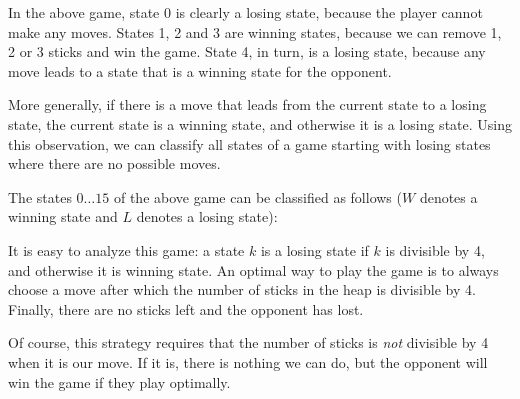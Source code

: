 In the above game, state 0 is clearly a
losing state, because the player cannot make
any moves.
States 1, 2 and 3 are winning states,
because we can remove 1, 2 or 3 sticks
and win the game.
State 4, in turn, is a losing state,
because any move leads to a state that
is a winning state for the opponent.

More generally, if there is a move that leads
from the current state to a losing state,
the current state is a winning state,
and otherwise it is a losing state.
Using this observation, we can classify all states
of a game starting with losing states where
there are no possible moves.

The states $0 \ldots 15$ of the above game
can be classified as follows
($W$ denotes a winning state and $L$ denotes a losing state):
\begin{center}
\end{center}

It is easy to analyze this game:
a state $k$ is a losing state if $k$ is
divisible by 4, and otherwise it
is winning state.
An optimal way to play the game is
to always choose a move after which
the number of sticks in the heap
is divisible by 4.
Finally, there are no sticks left and
the opponent has lost.

Of course, this strategy requires that
the number of sticks is \emph{not} divisible by 4
when it is our move.
If it is, there is nothing we can do,
but the opponent will win the game if
they play optimally.

